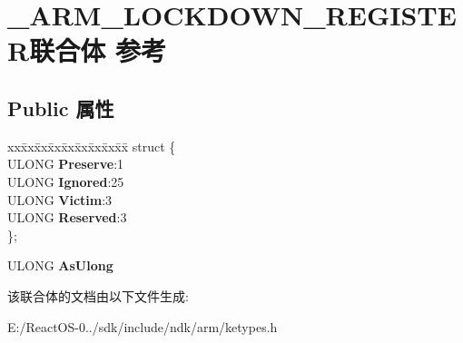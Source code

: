 \hypertarget{union___a_r_m___l_o_c_k_d_o_w_n___r_e_g_i_s_t_e_r}{}\section{\+\_\+\+A\+R\+M\+\_\+\+L\+O\+C\+K\+D\+O\+W\+N\+\_\+\+R\+E\+G\+I\+S\+T\+E\+R联合体 参考}
\label{union___a_r_m___l_o_c_k_d_o_w_n___r_e_g_i_s_t_e_r}
\subsection*{Public 属性}
\begin{DoxyCompactItemize}
\item 
\mbox{\label{union___a_r_m___l_o_c_k_d_o_w_n___r_e_g_i_s_t_e_r_a7b41c75e8be7fb24555f2001cad18efa}} 
\begin{tabbing}
xx\=xx\=xx\=xx\=xx\=xx\=xx\=xx\=xx\=\kill
struct \{\\
\>ULONG {\bfseries Preserve}:1\\
\>ULONG {\bfseries Ignored}:25\\
\>ULONG {\bfseries Victim}:3\\
\>ULONG {\bfseries Reserved}:3\\
\}; \\

\end{tabbing}\item 
\mbox{\label{union___a_r_m___l_o_c_k_d_o_w_n___r_e_g_i_s_t_e_r_ac8b06aa5bdb9ed9ecc004fbc556771bc}} 
U\+L\+O\+NG {\bfseries As\+Ulong}
\end{DoxyCompactItemize}


该联合体的文档由以下文件生成\+:\begin{DoxyCompactItemize}
\item 
E\+:/\+React\+O\+S-\/0../sdk/include/ndk/arm/ketypes.\+h\end{DoxyCompactItemize}
